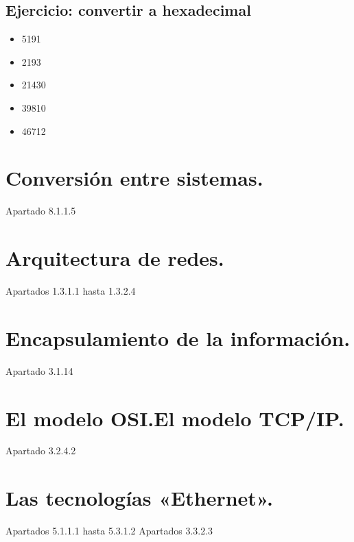 \documentclass[letterpaper,10pt,spanish]{sphinxmanual}
\begin{document}
\subsection{Ejercicio: convertir a hexadecimal}
\label{\detokenize{t1_caracterizacion_redes/apuntes_t1:ejercicio-convertir-a-hexadecimal}}\begin{itemize}
\item {} 
5191

\item {} 
2193

\item {} 
21430

\item {} 
39810

\item {} 
46712

\end{itemize}


\section{Conversión entre sistemas.}
\label{\detokenize{t1_caracterizacion_redes/apuntes_t1:conversion-entre-sistemas}}
Apartado 8.1.1.5


\section{Arquitectura de redes.}
\label{\detokenize{t1_caracterizacion_redes/apuntes_t1:arquitectura-de-redes}}
Apartados 1.3.1.1 hasta 1.3.2.4


\section{Encapsulamiento de la información.}
\label{\detokenize{t1_caracterizacion_redes/apuntes_t1:encapsulamiento-de-la-informacion}}
Apartado 3.1.14


\section{El modelo OSI.El modelo TCP/IP.}
\label{\detokenize{t1_caracterizacion_redes/apuntes_t1:el-modelo-osi-el-modelo-tcp-ip}}
Apartado 3.2.4.2


\section{Las tecnologías «Ethernet».}
\label{\detokenize{t1_caracterizacion_redes/apuntes_t1:las-tecnologias-ethernet}}
Apartados 5.1.1.1 hasta 5.3.1.2
Apartados 3.3.2.3
\end{document}
